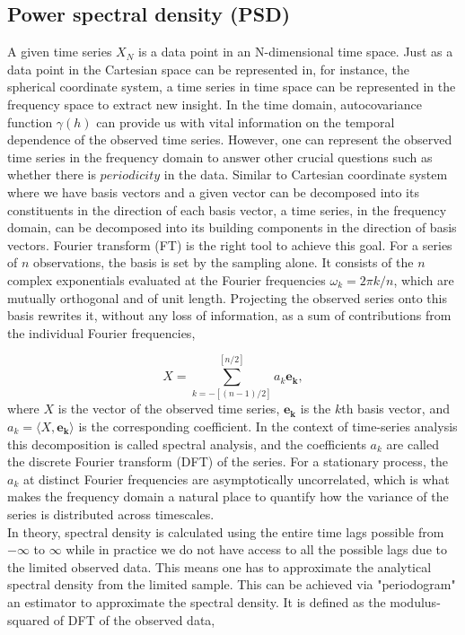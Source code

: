 \documentclass{aa}
\begin{document}
\subsection{Power spectral density (PSD)}
\label{subsec:PSD}
A given time series $X_N$ is a data point in an N-dimensional time space. Just as a data point in the Cartesian space can be represented in, for instance, the spherical coordinate system, a time series in time space can be represented in the frequency space to extract new insight. In the time domain, autocovariance function $\gamma(h)$ can provide us with vital information on the temporal dependence of the observed time series. However, one can represent the observed time series in the frequency domain to answer other crucial questions such as whether there is $periodicity$ in the data. Similar to Cartesian coordinate system where we have basis vectors and a given vector can be decomposed into its constituents in the direction of each basis vector, a time series, in the frequency domain, can be decomposed into its building components in the direction of basis vectors. Fourier transform (FT) is the right tool to achieve this goal. For a series of $n$ observations, the basis is set by the sampling alone. It consists of the $n$ complex exponentials evaluated at the Fourier frequencies $\omega_k = 2\pi k / n$, which are mutually orthogonal and of unit length. Projecting the observed series onto this basis rewrites it, without any loss of information, as a sum of contributions from the individual Fourier frequencies,

\begin{equation}
X = \sum_{k = -[(n-1)/2]}^{[n/2]} a_k\bm{e_k},
\label{eq:spectral_decomposition}
\end{equation}
where $X$ is the vector of the observed time series, $\bm{e_k}$ is the $k$th basis
vector, and $a_k = \langle X, \bm{e_k}\rangle$ is the corresponding coefficient. In the
context of time-series analysis this decomposition is called spectral analysis, and the
coefficients $a_k$ are called the discrete Fourier transform (DFT) of the series. For a
stationary process, the $a_k$ at distinct Fourier frequencies are asymptotically
uncorrelated, which is what makes the frequency domain a natural place to quantify how
the variance of the series is distributed across timescales. \\
In theory, spectral density is calculated using the entire time lags possible from $-\infty$ to $\infty$ while in practice we do not have access to all the possible lags due to the limited observed data. This means one has to approximate the analytical spectral density from the limited sample. This can be achieved via "periodogram" an estimator to approximate the spectral density. It is defined as the modulus-squared of DFT of the observed data,
\end{document}
